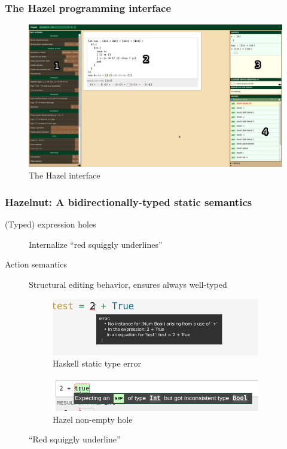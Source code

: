 \documentclass{beamer}
\begin{document}
\begin{frame}
  \frametitle{The Hazel programming interface}

  \begin{figure}
    \centering
    \includegraphics[width=.9\linewidth]{thesis/img/hazel_ui_annot.png}
    \caption{The Hazel interface}
    \label{fig:hazel-ui}
  \end{figure}

\end{frame}

\begin{frame}
  \frametitle{Hazelnut: A bidirectionally-typed static semantics}

  \begin{description}
  \item[(Typed) expression holes] Internalize ``red squiggly underlines''
  \item[Action semantics] Structural editing behavior, ensures always well-typed
  \end{description}

  \begin{figure}
    \centering
    \begin{subfigure}[b]{0.45\textwidth}
      \includegraphics[width=\textwidth]{thesis/img/haskell_squiggle}
      \caption{Haskell static type error}
    \end{subfigure}
    \qquad
    \begin{subfigure}[b]{0.45\textwidth}
      \includegraphics[width=\textwidth]{thesis/img/hazel_squiggle}
      \caption{Hazel non-empty hole}
    \end{subfigure}
    \caption{``Red squiggly underline''}
    \label{fig:hazelnut-action-sequence}
  \end{figure}
\end{frame}
\end{document}

